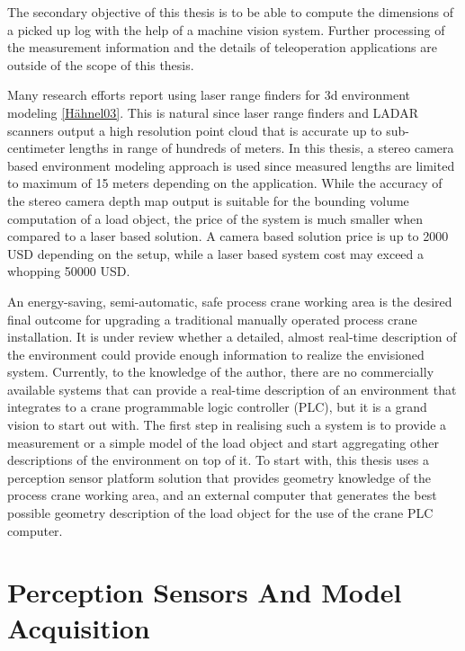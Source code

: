 \documentclass[12pt,a4paper,oneside,pdftex]{report}
\begin{document}
The secondary objective of this thesis is to be able to compute the dimensions of a picked up log with the help of a machine vision system. Further processing of the measurement information and the details of teleoperation applications are outside of the scope of this thesis.

Many research efforts report using laser range finders for 3d environment modeling \ref{Hähnel03}. This is natural since laser range finders and LADAR scanners output a high resolution point cloud that is accurate up to sub-centimeter lengths in range of hundreds of meters. In this thesis, a stereo camera based environment modeling approach is used since measured lengths are limited to maximum of 15 meters depending on the application. While the accuracy of the stereo camera depth map output is suitable for the bounding volume computation of a load object, the price of the system is much smaller when compared to a laser based solution. A camera based solution price is up to 2000 USD depending on the setup, while a laser based system cost may exceed a whopping 50000 USD.


An energy-saving, semi-automatic, safe process crane working area is the desired final outcome for upgrading a traditional manually operated process crane installation. It is under review whether a detailed, almost real-time description of the environment could provide enough information to realize the envisioned system. Currently, to the knowledge of the author, there are no commercially available systems that can provide a real-time description of an environment that integrates to a crane programmable logic controller (PLC), but it is a grand vision to start out with. The first step in realising such a system is to provide a measurement or a simple model of the load object and start aggregating other descriptions of the environment on top of it. To start with, this thesis uses a perception sensor platform solution that provides geometry knowledge of the process crane working area, and an external computer that generates the best possible geometry description of the load object for the use of the crane PLC computer. 

\chapter{Perception Sensors And Model Acquisition}
\label{chapter:perception_sensors_and_model_acquisition}
\end{document}
